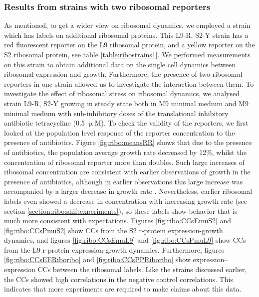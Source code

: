 \subsubsection{Results from strains with two ribosomal reporters}

As mentioned, to get a wider view on ribosomal dynamics, we employed a strain which has labels on additional ribosomal proteins. 
%
This L9-R, S2-Y strain has a red fluorescent reporter on the L9 ribosomal protein, and a yellow reporter on the S2 ribosomal protein, see table \ref{table:ribostrains1}.
%
We performed measurements on this strain 
to obtain additional data 
on the single cell dynamics between ribosomal expression and growth.
%
Furthermore, the presence of two ribosomal reporters in one strain allowed us to investigate the interaction between them.
%
To investigate the effect of ribosomal stress on ribosomal dynamics, 
we analysed strain L9-R, S2-Y 
growing in steady state both in M9 minimal medium and M9 minimal medium with sub-inhibitory doses of the translational inhibitory antibiotic tetracycline (0.5 $\upmu$M).
%
To check the validity of the reporters, 
we first looked at the population level response of the reporter concentration to the presence of antibiotics.
Figure \ref{fig:ribo:meansRR} shows that due to the presence of antibiotics, the population average growth rate decreased by 12\%, whilst the concentration of ribosomal reporter more than doubles.
%
Such large increases of ribosomal concentration are consistent with earlier observations of growth in the presence of antibiotics, although in earlier observations this large increase was accompanied by a larger decrease in growth rate \cite{Hui2015}.
%
Nevertheless, earlier ribosomal labels even showed a decrease in concentration with increasing growth rate (see section \ref{section:ribo:shiftexperiments}), 
so these labels show behavior that is much more consistent with expectations.
%
Figures \ref{fig:ribo:CCsEmuS2} and \ref{fig:ribo:CCsPmuS2} show CCs from the S2 r-protein expression-growth dynamics, and 
figures \ref{fig:ribo:CCsEmuL9} and \ref{fig:ribo:CCsPmuL9} show CCs from the L9 r-protein expression-growth dynamics.
Furthermore, figures \ref{fig:ribo:CCsEERiboribo} and \ref{fig:ribo:CCsPPRiboribo} show expression--expression CCs between the ribosomal labels.
%
Like the strains discussed earlier, the CCs showed high correlations in the negative control correlations.
This indicates that more experiments are required to make claims about this data.




